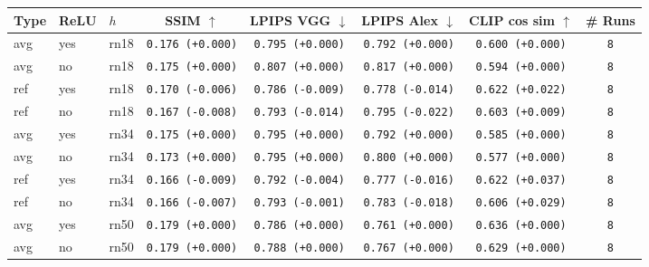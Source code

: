 \begin{tabular}{|l|l|l|c|c|c|c|c|}
\hline
Type & ReLU & $h$ & SSIM $\uparrow$ & LPIPS VGG $\downarrow$ & LPIPS Alex $\downarrow$ & CLIP cos sim $\uparrow$ & \# Runs \\
\hline
\rowcolor{verylightgray}avg & yes & rn18 & \texttt{0.176 {\color{black}(+0.000)}} & \texttt{0.795 {\color{black}(+0.000)}} & \texttt{0.792 {\color{black}(+0.000)}} & \texttt{0.600 {\color{black}(+0.000)}} & \texttt{8} \\
\rowcolor{verylightgray}avg & no & rn18 & \texttt{0.175 {\color{black}(+0.000)}} & \texttt{0.807 {\color{black}(+0.000)}} & \texttt{0.817 {\color{black}(+0.000)}} & \texttt{0.594 {\color{black}(+0.000)}} & \texttt{8} \\
\hline
ref & yes & rn18 & \texttt{0.170 {\color{red}(-0.006)}} & \texttt{0.786 {\color{green}(-0.009)}} & \texttt{0.778 {\color{green}(-0.014)}} & \texttt{0.622 {\color{green}(+0.022)}} & \texttt{8} \\
ref & no & rn18 & \texttt{0.167 {\color{red}(-0.008)}} & \texttt{0.793 {\color{green}(-0.014)}} & \texttt{0.795 {\color{green}(-0.022)}} & \texttt{0.603 {\color{green}(+0.009)}} & \texttt{8} \\
\hline
\rowcolor{verylightgray}avg & yes & rn34 & \texttt{0.175 {\color{black}(+0.000)}} & \texttt{0.795 {\color{black}(+0.000)}} & \texttt{0.792 {\color{black}(+0.000)}} & \texttt{0.585 {\color{black}(+0.000)}} & \texttt{8} \\
\rowcolor{verylightgray}avg & no & rn34 & \texttt{0.173 {\color{black}(+0.000)}} & \texttt{0.795 {\color{black}(+0.000)}} & \texttt{0.800 {\color{black}(+0.000)}} & \texttt{0.577 {\color{black}(+0.000)}} & \texttt{8} \\
\hline
ref & yes & rn34 & \texttt{0.166 {\color{red}(-0.009)}} & \texttt{0.792 {\color{green}(-0.004)}} & \texttt{0.777 {\color{green}(-0.016)}} & \texttt{0.622 {\color{green}(+0.037)}} & \texttt{8} \\
ref & no & rn34 & \texttt{0.166 {\color{red}(-0.007)}} & \texttt{0.793 {\color{green}(-0.001)}} & \texttt{0.783 {\color{green}(-0.018)}} & \texttt{0.606 {\color{green}(+0.029)}} & \texttt{8} \\
\hline
\rowcolor{verylightgray}avg & yes & rn50 & \texttt{0.179 {\color{black}(+0.000)}} & \texttt{0.786 {\color{black}(+0.000)}} & \texttt{0.761 {\color{black}(+0.000)}} & \texttt{0.636 {\color{black}(+0.000)}} & \texttt{8} \\
\rowcolor{verylightgray}avg & no & rn50 & \texttt{0.179 {\color{black}(+0.000)}} & \texttt{0.788 {\color{black}(+0.000)}} & \texttt{0.767 {\color{black}(+0.000)}} & \texttt{0.629 {\color{black}(+0.000)}} & \texttt{8} \\

\end{tabular}
